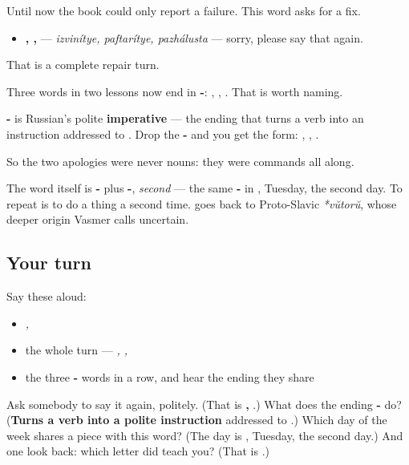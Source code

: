 Until now the book could only report a failure. This word asks for a fix.

\begin{itemize}
\raggedright
  \item \textbf{, , } — \emph{izvinítye, paftarítye, pazhálusta} — sorry, please say that again.
\end{itemize}

That is a complete repair turn.

\begin{grammarlens}[title={Grammar lens — the -\ru{ите} ending is an order}]
Three words in two lessons now end in \textbf{-}: \textbf{}, \textbf{}, \textbf{}. That is worth naming.

\textbf{-} is Russian's polite \textbf{imperative} — the ending that turns a verb into an instruction addressed to \textbf{}. Drop the \textbf{-} and you get the \textbf{} form: \emph{}, \emph{}, \emph{}.

So the two apologies were never nouns: they were commands all along.

The word itself is \textbf{-} plus \textbf{-}, \emph{second} — the same \textbf{-} in \textbf{}, Tuesday, the second day. To repeat is to do a thing a second time. \textbf{} goes back to Proto-Slavic \emph{*vŭtorŭ}, whose deeper origin Vasmer calls uncertain.
\end{grammarlens}

\subsection*{Your turn}
Say these aloud:

\begin{itemize}
\raggedright
  \item \emph{, }
  \item the whole turn — \emph{, , }
  \item the three \textbf{-} words in a row, and hear the ending they share
\end{itemize}

\begin{tcolorbox}[breakable,colback=teal!4,colframe=teal!35!black,title={Before you move on}]
Ask somebody to say it again, politely. (That is \textbf{, }.) What does the ending \textbf{-} do? (\textbf{Turns a verb into a polite instruction} addressed to \emph{}.) Which day of the week shares a piece with this word? (The day is \textbf{}, Tuesday, the second day.) And one look back: which letter did \emph{} teach you? (That is \textbf{}.)
\end{tcolorbox}
